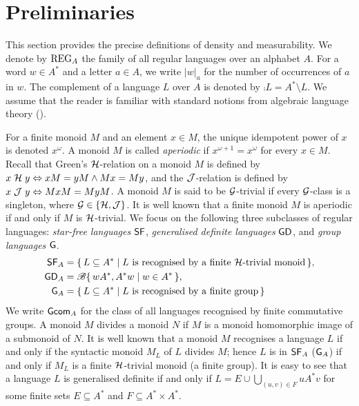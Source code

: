 \section{Preliminaries}\label{sec:pre}
This section provides the precise definitions of density and measurability.
We denote by \(\reg_A\) the family of all regular languages over an alphabet \(A\). For a word \(w \in A^*\) and a letter \(a \in A\), we write \(|w|_a\) for the number of occurrences of \(a\) in \(w\). The complement of a language \(L\) over \(A\) is denoted by \(\comp{L} = A^* \setminus L\).
We assume that the reader is familiar with standard notions from algebraic language theory (\cf \cite{Lawson,DAM,MPRI}).

For a finite monoid \(M\) and an element \(x \in M\), the unique idempotent power of \(x\) is denoted \(x^\omega\).
A monoid \(M\) is called \emph{aperiodic} if \(x^{\omega+1} = x^\omega\) for every \(x \in M\).
Recall that Green's \(\CH\)-relation on a monoid \(M\) is defined by \(x \CH y \Leftrightarrow xM = yM \land Mx = My\), and
the \(\CJ\)-relation is defined by \(x \CJ y \Leftrightarrow MxM = MyM\).
A monoid \(M\) is said to be \({\cal G}\)-trivial if every \({\cal G}\)-class is a singleton, where \({\cal G} \in \{\CH, \CJ\}\).
It is well known that a finite monoid \(M\) is aperiodic if and only if \(M\) is \(\CH\)-trivial.
We focus on the following three subclasses of regular languages: \emph{star-free languages} \(\sf\), \emph{generalised definite languages} \(\gd\), and \emph{group languages} \(\group\).
\begin{align*}
 \sf_A &\defeq \set{L \subseteq A^*}{L \text{ is recognised by a finite \(\CH\)-trivial monoid}},\\
 \gd_A &\defeq \bool\set{wA^*, A^*w}{w \in A^*},\\
 \group_A &\defeq \set{L \subseteq A^*}{L \text{ is recognised by a finite group}}
\end{align*}
We write \(\gcom_A\) for the class of all languages recognised by finite commutative groups.
A monoid \(M\) divides a monoid \(N\) if \(M\) is a monoid homomorphic image of a submonoid of \(N\).
It is well known that a monoid \(M\) recognises a language \(L\) if and only if the syntactic monoid \(M_L\) of \(L\) divides \(M\); hence
\(L\) is in \(\sf_A\) (\resp \(\group_A\)) if and only if \(M_L\) is a finite \(\CH\)-trivial monoid (\resp a finite group).
It is easy to see that a language \(L\) is generalised definite if and only if \(L = E \cup \bigcup_{(u, v) \in F} uA^*v\) for some finite sets \(E \subseteq A^*\) and \(F \subseteq A^* \times A^*\).

